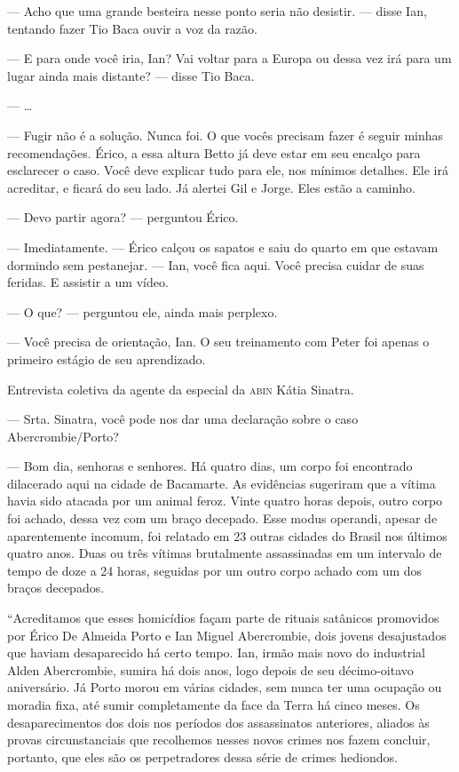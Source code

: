 --- Acho que uma grande besteira nesse ponto seria não desistir. ---
disse Ian, tentando fazer Tio Baca ouvir a voz da razão.

--- E para onde você iria, Ian? Vai voltar para a Europa ou dessa vez
irá para um lugar ainda mais distante? --- disse Tio Baca.

--- \ldots

--- Fugir não é a solução. Nunca foi. O que vocês precisam fazer é
seguir minhas recomendações. Érico, a essa altura Betto já deve estar em
seu encalço para esclarecer o caso. Você deve explicar tudo para ele,
nos mínimos detalhes. Ele irá acreditar, e ficará do seu lado. Já
alertei Gil e Jorge. Eles estão a caminho.

--- Devo partir agora? --- perguntou Érico.

--- Imediatamente. --- Érico calçou os sapatos e saiu do quarto em que
estavam dormindo sem pestanejar. --- Ian, você fica aqui. Você precisa
cuidar de suas feridas. E assistir a um vídeo.

--- O que? --- perguntou ele, ainda mais perplexo.

--- Você precisa de orientação, Ian. O seu treinamento com Peter foi
apenas o primeiro estágio de seu aprendizado.


Entrevista coletiva da agente da especial da \textsc{abin} Kátia
Sinatra.

--- Srta. Sinatra, você pode nos dar uma declaração sobre o caso
Abercrombie\slash Porto?

--- Bom dia, senhoras e senhores. Há quatro dias, um corpo foi
encontrado dilacerado aqui na cidade de Bacamarte. As evidências
sugeriram que a vítima havia sido atacada por um animal feroz. Vinte
quatro horas depois, outro corpo foi achado, dessa vez com um braço
decepado. Esse modus operandi, apesar de aparentemente incomum, foi
relatado em 23 outras cidades do Brasil nos últimos quatro anos. Duas ou
três vítimas brutalmente assassinadas em um intervalo de tempo de doze a
24 horas, seguidas por um outro corpo achado com um dos braços
decepados.

“Acreditamos que esses homicídios façam parte de rituais satânicos
promovidos por Érico De Almeida Porto e Ian Miguel Abercrombie, dois
jovens desajustados que haviam desaparecido há certo tempo. Ian, irmão
mais novo do industrial Alden Abercrombie, sumira há dois anos, logo
depois de seu décimo-oitavo aniversário. Já Porto morou em várias
cidades, sem nunca ter uma ocupação ou moradia fixa, até sumir
completamente da face da Terra há cinco meses. Os desaparecimentos dos
dois nos períodos dos assassinatos anteriores, aliados às provas
circunstanciais que recolhemos nesses novos crimes nos fazem concluir,
portanto, que eles são os perpetradores dessa série de crimes hediondos.

